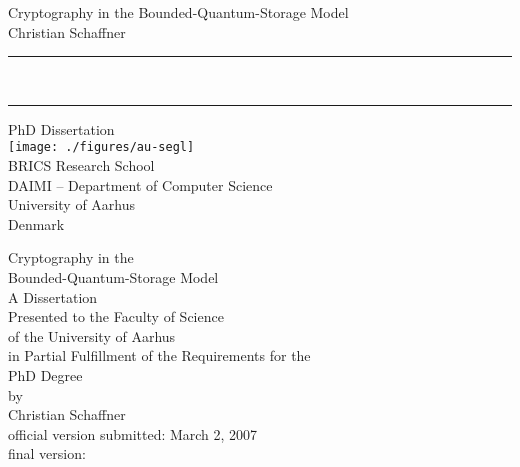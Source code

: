 
\vspace*{\fill}
\begin{flushright}
  {\Huge\sf Cryptography in the Bounded-Quantum-Storage Model}\\[3ex]
  {\huge\sf Christian Schaffner} 
\end{flushright}
\noindent\rule{\linewidth}{1mm}\\[-.5ex]
\noindent\rule{\linewidth}{2.5mm}
\vfill
\begin{center}
  {\huge\sf PhD Dissertation}\\[\fill]
  \texttt{[image: ./figures/au-segl]}\\[\fill]
  {\sf BRICS Research School\\DAIMI -- Department of Computer Science\\University of Aarhus\\Denmark}
\end{center}
\vspace*{\fill}
\cleardoublepage
\begin{center}
  {\huge Cryptography in the\\[3mm]
Bounded-Quantum-Storage Model}\\[\fill]
  A Dissertation\\
  Presented to the Faculty of Science\\
  of the University of Aarhus\\
  in Partial Fulfillment of the Requirements for the\\
  PhD Degree\\[\stretch{2}]
  by\\
  Christian Schaffner\\
  official version submitted: March 2, 2007\\[5mm]

  final version: \makeatletter\@date\makeatother\\
\end{center}


\clearemptydoublepage
\pagestyle{plain}
{}
